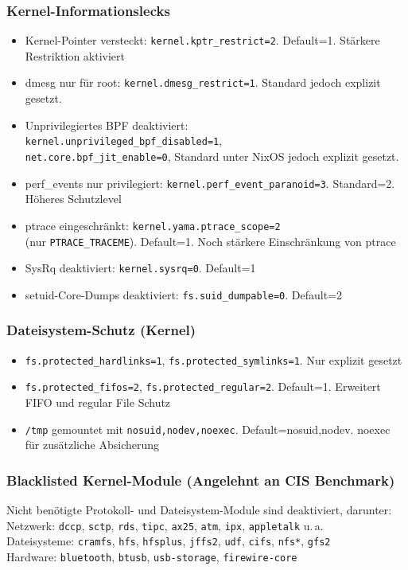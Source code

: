 \subsubsection*{Kernel-Informationslecks}
\begin{itemize}
  \item Kernel-Pointer versteckt: \texttt{kernel.kptr\_restrict=2}. Default=1. Stärkere Restriktion aktiviert
  \item dmesg nur für root: \texttt{\textcolor{OliveGreen}{kernel.dmesg\_restrict=1}}. Standard jedoch explizit gesetzt.
  \item Unprivilegiertes BPF deaktiviert: \\
  \textcolor{OliveGreen}{\texttt{kernel.unprivileged\_bpf\_disabled=1},\\
  \texttt{net.core.bpf\_jit\_enable=0}}, Standard unter NixOS jedoch explizit gesetzt.
  \item perf\_events nur privilegiert: \texttt{kernel.perf\_event\_paranoid=3}. Standard=2. Höheres Schutzlevel
  \item ptrace eingeschränkt: \texttt{kernel.yama.ptrace\_scope=2}\\(nur \texttt{PTRACE\_TRACEME}). Default=1. Noch stärkere Einschränkung von ptrace
  \item SysRq deaktiviert: \texttt{kernel.sysrq=0}. Default=1
  \item setuid-Core-Dumps deaktiviert: \texttt{fs.suid\_dumpable=0}. Default=2
\end{itemize}

\subsubsection*{Dateisystem-Schutz (Kernel)}
\begin{itemize}
  \item \textcolor{OliveGreen}{\texttt{fs.protected\_hardlinks=1}, \texttt{fs.protected\_symlinks=1}}. Nur explizit gesetzt
  \item \texttt{fs.protected\_fifos=2}, \texttt{fs.protected\_regular=2}. Default=1. Erweitert FIFO und regular File Schutz
  \item \texttt{/tmp} gemountet mit \texttt{nosuid,nodev,noexec}. Default=nosuid,nodev. noexec für zusätzliche Absicherung
\end{itemize}

\subsubsection*{Blacklisted Kernel-Module (Angelehnt an CIS Benchmark)}
Nicht benötigte Protokoll- und Dateisystem-Module sind deaktiviert, darunter:\\
Netzwerk: \texttt{dccp}, \texttt{sctp}, \texttt{rds}, \texttt{tipc}, \texttt{ax25}, \texttt{atm}, \texttt{ipx}, \texttt{appletalk} u.\,a.\\
Dateisysteme: \texttt{cramfs}, \texttt{hfs}, \texttt{hfsplus}, \texttt{jffs2}, \texttt{udf}, \texttt{cifs}, \texttt{nfs*}, \texttt{gfs2}\\
Hardware: \texttt{bluetooth}, \texttt{btusb}, \texttt{usb-storage}, \texttt{firewire-core}

